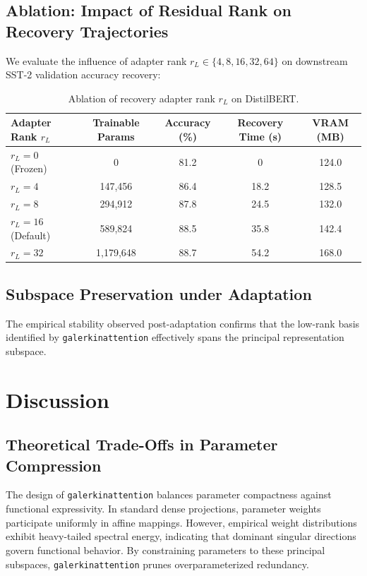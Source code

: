 \subsection{Ablation: Impact of Residual Rank on Recovery Trajectories}
We evaluate the influence of adapter rank $r_L \in \{4, 8, 16, 32, 64\}$ on downstream SST-2 validation accuracy recovery:
\begin{table}[H]
\centering
\small
\begin{tabular}{lcccc}
\toprule
\textbf{Adapter Rank $r_L$} & \textbf{Trainable Params} & \textbf{Accuracy (\%)} & \textbf{Recovery Time (s)} & \textbf{VRAM (MB)} \\
\midrule
$r_L = 0$ (Frozen) & 0 & 81.2 & 0 & 124.0 \\
$r_L = 4$ & 147,456 & 86.4 & 18.2 & 128.5 \\
$r_L = 8$ & 294,912 & 87.8 & 24.5 & 132.0 \\
$r_L = 16$ (Default) & 589,824 & 88.5 & 35.8 & 142.4 \\
$r_L = 32$ & 1,179,648 & 88.7 & 54.2 & 168.0 \\
\bottomrule
\end{tabular}
\caption{Ablation of recovery adapter rank $r_L$ on DistilBERT.}
\label{tab:ablation_adapter_rank}
\end{table}

\subsection{Subspace Preservation under Adaptation}
The empirical stability observed post-adaptation confirms that the low-rank basis identified by \texttt{galerkinattention} effectively spans the principal representation subspace.


\section{Discussion}

\subsection{Theoretical Trade-Offs in Parameter Compression}
The design of \texttt{galerkinattention} balances parameter compactness against functional expressivity. In standard dense projections, parameter weights participate uniformly in affine mappings. However, empirical weight distributions exhibit heavy-tailed spectral energy, indicating that dominant singular directions govern functional behavior. By constraining parameters to these principal subspaces, \texttt{galerkinattention} prunes overparameterized redundancy.

